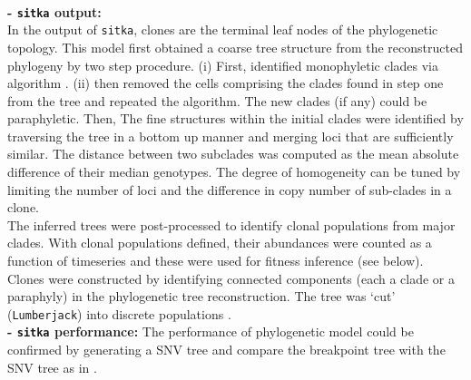 \\
\textbf{- \texttt{sitka} \textbf{output:} }
\\
In the output of \texttt{sitka}, clones are the terminal leaf nodes of the phylogenetic topology.  
This model first obtained a coarse tree structure from the reconstructed phylogeny by two step procedure. (i) First, identified  monophyletic clades via algorithm \cite{salehi2020single}. 
(ii) then removed the cells comprising the clades found in step one from the tree and repeated the algorithm. The new clades (if any) could be paraphyletic. Then, The fine structures within the initial clades were identified by traversing the tree in a bottom up manner and merging loci that are sufficiently similar.
The distance between two subclades was computed as the mean absolute difference of their median genotypes.
The degree of homogeneity can be tuned by limiting the number of loci and the difference in copy number of sub-clades in a clone. 
\\
The inferred trees were post-processed to identify clonal populations from major clades. With clonal populations defined, their abundances were counted as a function of timeseries and these were used for fitness inference (see below). 
\\
Clones were constructed by identifying connected components (each a clade or a paraphyly) in the phylogenetic tree reconstruction. The tree was `cut' (\texttt{Lumberjack}) into discrete populations  \cite{salehi2020single}.
\\
\textbf{- \texttt{sitka} \textbf{performance:} }
The performance of phylogenetic model could be confirmed by generating a SNV tree and compare the breakpoint tree with the SNV tree as in \cite{laks2019clonal}. 







